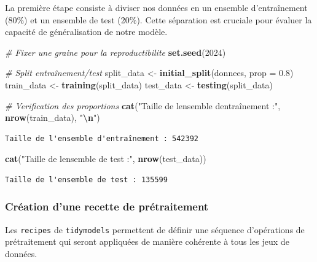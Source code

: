 \documentclass[
  french,
]{book}
\newenvironment{Shaded}{\begin{snugshade}}{\end{snugshade}}
\newcommand{\AttributeTok}[1]{\textcolor[rgb]{0.13,0.29,0.53}{#1}}
\newcommand{\CommentTok}[1]{\textcolor[rgb]{0.56,0.35,0.01}{\textit{#1}}}
\newcommand{\DecValTok}[1]{\textcolor[rgb]{0.00,0.00,0.81}{#1}}
\newcommand{\FloatTok}[1]{\textcolor[rgb]{0.00,0.00,0.81}{#1}}
\newcommand{\FunctionTok}[1]{\textcolor[rgb]{0.13,0.29,0.53}{\textbf{#1}}}
\newcommand{\NormalTok}[1]{#1}
\newcommand{\OtherTok}[1]{\textcolor[rgb]{0.56,0.35,0.01}{#1}}
\newcommand{\SpecialCharTok}[1]{\textcolor[rgb]{0.81,0.36,0.00}{\textbf{#1}}}
\newcommand{\StringTok}[1]{\textcolor[rgb]{0.31,0.60,0.02}{#1}}
\theoremstyle{definition}
\theoremstyle{definition}
\theoremstyle{definition}
\theoremstyle{definition}
\theoremstyle{remark}
\begin{document}
La première étape consiste à diviser nos données en un ensemble d'entraînement (80\%) et un ensemble de test (20\%). Cette séparation est cruciale pour évaluer la capacité de généralisation de notre modèle.

\begin{Shaded}
\begin{Highlighting}[]
\CommentTok{\# Fixer une graine pour la reproductibilite}
\FunctionTok{set.seed}\NormalTok{(}\DecValTok{2024}\NormalTok{)}

\CommentTok{\# Split entraînement/test}
\NormalTok{split\_data }\OtherTok{\textless{}{-}} \FunctionTok{initial\_split}\NormalTok{(donnees, }\AttributeTok{prop =} \FloatTok{0.8}\NormalTok{)}
\NormalTok{train\_data }\OtherTok{\textless{}{-}} \FunctionTok{training}\NormalTok{(split\_data)}
\NormalTok{test\_data }\OtherTok{\textless{}{-}} \FunctionTok{testing}\NormalTok{(split\_data)}

\CommentTok{\# Verification des proportions}
\FunctionTok{cat}\NormalTok{(}\StringTok{"Taille de l\textquotesingle{}ensemble d\textquotesingle{}entraînement :"}\NormalTok{, }\FunctionTok{nrow}\NormalTok{(train\_data), }\StringTok{"}\SpecialCharTok{\textbackslash{}n}\StringTok{"}\NormalTok{)}
\end{Highlighting}
\end{Shaded}

\begin{verbatim}
Taille de l'ensemble d'entraînement : 542392 
\end{verbatim}

\begin{Shaded}
\begin{Highlighting}[]
\FunctionTok{cat}\NormalTok{(}\StringTok{"Taille de l\textquotesingle{}ensemble de test :"}\NormalTok{, }\FunctionTok{nrow}\NormalTok{(test\_data))}
\end{Highlighting}
\end{Shaded}

\begin{verbatim}
Taille de l'ensemble de test : 135599
\end{verbatim}

\subsubsection*{Création d'une recette de prétraitement}

Les \texttt{recipes} de \texttt{tidymodels} permettent de définir une séquence d'opérations de prétraitement qui seront appliquées de manière cohérente à tous les jeux de données.
\end{document}
